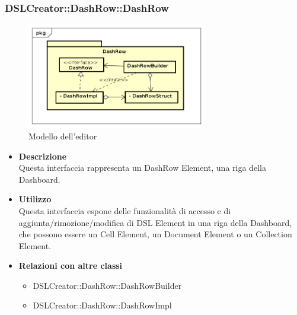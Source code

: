                 \subsubsection{DSLCreator::DashRow::DashRow}
                \begin{figure}[H]
                  \centering
                  \includegraphics[width=0.7\textwidth]{res/img/DashRow.png}
                  \caption{Modello dell'editor}
                  \label{fig:diagram_model}
                \end{figure}
                    \begin{itemize}
                        \item \textbf{Descrizione} \hfill \\
                            Questa interfaccia rappresenta un DashRow Element, una riga della Dashboard.
                        \item \textbf{Utilizzo} \hfill \\
                            Questa interfaccia espone delle funzionalità di accesso e di aggiunta/rimozione/modifica di DSL Element in una riga della Dashboard, che possono essere un Cell Element, un Document Element o un Collection Element. 
                        \item \textbf{Relazioni con altre classi}
                            \begin{itemize}
                              \item DSLCreator::DashRow::DashRowBuilder
                              \item DSLCreator::DashRow::DashRowImpl
                            \end{itemize}
                    \end{itemize}

